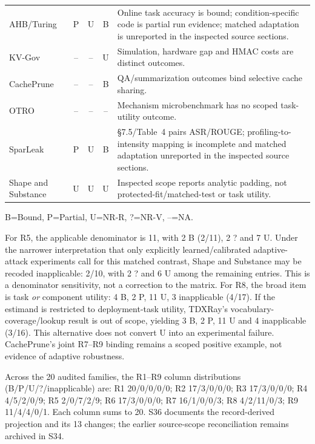 \begin{table}[t]
\begin{tabularx}{\textwidth}{@{}lcccX@{}}
AHB/Turing & P & U & B & Online task accuracy is bound; condition-specific code is partial run evidence; matched adaptation is unreported in the inspected source sections.\\
KV-Gov & -- & -- & U & Simulation, hardware gap and HMAC costs are distinct outcomes.\\
CachePrune & -- & -- & B & QA/summarization outcomes bind selective cache sharing.\\
OTRO & -- & -- & -- & Mechanism microbenchmark has no scoped task-utility outcome.\\
SparLeak & P & U & B & \S7.5/Table~4 pairs ASR/ROUGE; profiling-to-intensity mapping is incomplete and matched adaptation unreported in the inspected source sections.\\
Shape and Substance & U & U & U & Inspected scope reports analytic padding, not protected-fit/matched-test or task utility.\\\bottomrule
\end{tabularx}\end{table}
\noindent\footnotesize B=Bound, P=Partial, U=NR-R, ?=NR-V, --=NA.

For R5, the applicable denominator is 11, with 2 B (2/11), 2 ? and 7 U. Under the narrower interpretation that only explicitly learned/calibrated adaptive-attack experiments call for this matched contrast, Shape and Substance may be recoded inapplicable: 2/10, with 2 ? and 6 U among the remaining entries. This is a denominator sensitivity, not a correction to the matrix. For R8, the broad item is task \emph{or} component utility: 4 B, 2 P, 11 U, 3 inapplicable (4/17). If the estimand is restricted to deployment-task utility, TDXRay's vocabulary-coverage/lookup result is out of scope, yielding 3 B, 2 P, 11 U and 4 inapplicable (3/16). This alternative does not convert U into an experimental failure. CachePrune's joint R7--R9 binding remains a scoped positive example, not evidence of adaptive robustness.

Across the 20 audited families, the R1--R9 column distributions (B/P/U/?/inapplicable) are: R1 20/0/0/0/0; R2 17/3/0/0/0; R3 17/3/0/0/0; R4 4/5/2/0/9; R5 2/0/7/2/9; R6 17/3/0/0/0; R7 16/1/0/0/3; R8 4/2/11/0/3; R9 11/4/4/0/1. Each column sums to 20. S36 documents the record-derived projection and its 13 changes; the earlier source-scope reconciliation remains archived in S34.
